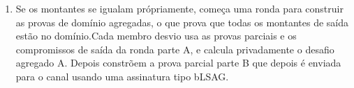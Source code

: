 \begin{enumerate}

\footnote{Visto que os pontos de CE são comprimidos (secção \ref{point_compression_section}), as chaves são interpretadas como inteiros de 32 bytes. É convenção que o dono da chave menor adiciona, e o dono da chave maior subtrai.}
\footnote{Não se publicam os montantes das taxas separadas pagas, no caso em que um participante se enganou no cálculo da taxa. O que pode revelar um grupo de saídas, devido aos montantes estranhos que sobressaem. Se os montantes não...?}
    \item Se os montantes se igualam própriamente, começa uma ronda para construir as provas de domínio agregadas, o que prova que todas os montantes de saída estão no domínio.\newline Cada membro desvio usa as provas parciais e os compromissos de saída da ronda parte A, e calcula privadamente o desafio agregado A. Depois constrõem a prova parcial parte B que depois é enviada para o canal usando uma assinatura tipo bLSAG.      


\end{enumerate}
